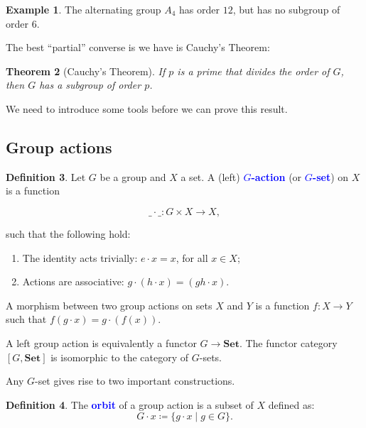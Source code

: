 \documentclass[12pt]{report}
\newenvironment{bluebox}{\begin{tcolorbox}[colback=blue!5!white,colframe=blue!75!black]}{\end{tcolorbox}}
\newcommand{\indx}[1]{\index{#1}\textbf{\textcolor{blue}{#1}}}
\newcommand{\Set}{\mathbf{Set}}
\newtheorem{theorem}{Theorem}[section] %
\theoremstyle{definition}
\newtheorem{definition}[theorem]{Definition}
\newtheorem{example}[theorem]{Example}
\newenvironment{categorybox}{\begin{bluebox}}{\end{bluebox}}
\begin{document}
\begin{example}
  The alternating group \(A_{4}\) has order \(12\), but has no subgroup of order 6.
\end{example}

The best ``partial'' converse is we have is Cauchy's Theorem:

\begin{theorem}[Cauchy's Theorem]\label{thm:group-theory:cauchys-theorem}
  If \(p\) is a prime that divides the order of \(G\), then \(G\) has a subgroup of order \(p\).
\end{theorem}

We need to introduce some tools before we can prove this result.

\subsection{Group actions}

\begin{definition}\label{def:group-theory:group-action}
  Let \(G\) be a group and \(X\) a set. A (left) \indx{\(G\)-action} (or \indx{\(G\)-set}) on \(X\) is a function

  \[\_ \cdot \_ :  G \times X \to X,\]

  such that the following hold:

  \begin{enumerate}
    \item The identity acts trivially: \(e \cdot x = x\), for all \(x \in X\);
    \item Actions are associative: \(g \cdot (h \cdot x) = (gh \cdot x)\).
  \end{enumerate}

  A morphism between two group actions on sets \(X\) and \(Y\) is a function \(f: X \to Y\) such that \(f(g\cdot x) = g \cdot (f(x))\).
\end{definition}

\begin{categorybox}
  A left group action is equivalently a functor \(G \to \Set\). The functor category \([G, \Set]\) is isomorphic to the category of \(G\)-sets.
\end{categorybox}

Any \(G\)-set gives rise to two important constructions.

\begin{definition}\label{def:group-theory:orbit}
  The \indx{orbit} of a group action is a subset of \(X\) defined as:
  \[G \cdot x \coloneqq \{g \cdot x \mid g \in G\}.\]
\end{definition}
\end{document}
